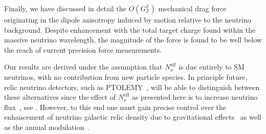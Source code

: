 Finally, we have discussed in detail the $O(G_F^2)$ mechanical drag force  originating in the dipole anisotropy induced by motion relative to the neutrino background.  Despite enhancement with the total target charge found within the massive neutrino wavelength, the magnitude of the force is found to be well below the reach of current  precision force measurements.

Our results are derived under the assumption that $N_\nu^{\mathrm{eff}}$ is due entirely to SM neutrinos, with no contribution from new particle species. In principle future, relic neutrino detectors, such as PTOLEMY~\cite{Betts:2013uya}, will be able to distinguish between these alternatives since the effect of $N_\nu^{\mathrm{eff}}$ as presented here is to increase neutrino flux~\cite{Birrell:2012gg}, see . However, to this end one must gain precise control over the enhancement of neutrino galactic relic density due to  gravitational effects~\cite{Ringwald:2004np} as well as the annual modulation~\cite{Safdi:2014rza}. 